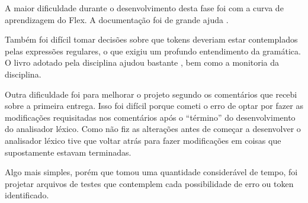 \documentclass[12pt]{article}
\begin{document}
\indent
A maior dificuldade durante o desenvolvimento desta fase foi com a curva de aprendizagem do Flex. A documentação foi de grande ajuda \cite{flexmanual}.

Também foi difícil tomar decisões sobre que tokens deveriam estar contemplados pelas expressões regulares, o que exigiu um profundo entendimento da gramática. O livro adotado pela disciplina ajudou bastante \cite{compiladores2008}, bem como a monitoria da disciplina.

Outra dificuldade foi para melhorar o projeto segundo os comentários que recebi sobre a primeira entrega. Isso foi difícil porque cometi o erro de optar por fazer as modificações requisitadas nos comentários após o ``término'' do desenvolvimento do analisador léxico. Como não fiz as alterações antes de começar a desenvolver o analisador léxico tive que voltar atrás para fazer modificações em coisas que supostamente estavam terminadas.

Algo mais simples, porém que tomou uma quantidade considerável de tempo, foi projetar arquivos de testes que contemplem cada possibilidade de erro ou token identificado.



\end{document}
